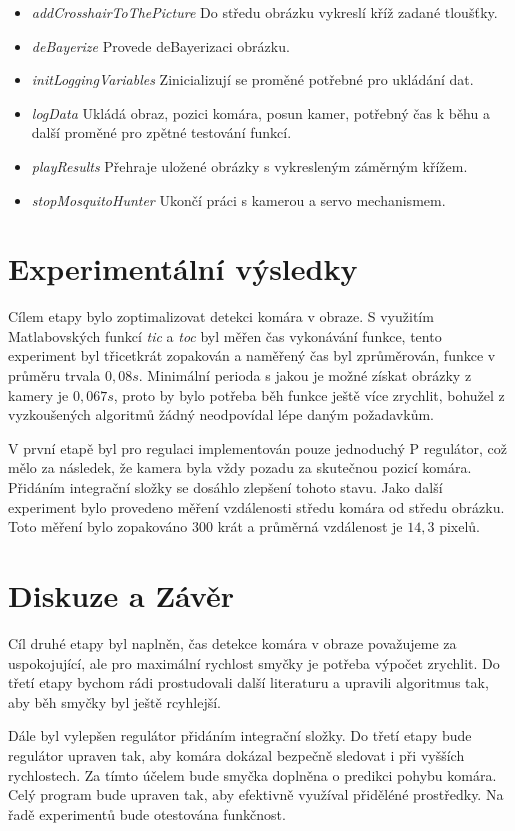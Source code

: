 \documentclass[a4paper,10pt]{article}
\begin{document}
		\begin{itemize}
				\item \textit{addCrosshairToThePicture} Do středu obrázku vykreslí kříž zadané tloušťky. 
				\item \textit{deBayerize} Provede deBayerizaci obrázku.
				\item \textit{initLoggingVariables} Zinicializují se proměné potřebné pro ukládání dat.
				\item \textit{logData} Ukládá obraz, pozici komára, posun kamer, potřebný čas k běhu a další proměné pro zpětné testování funkcí.
				\item \textit{playResults} Přehraje uložené obrázky s vykresleným záměrným křížem.
				\item \textit{stopMosquitoHunter} Ukončí práci s kamerou a servo mechanismem.
		\end{itemize}

\section{Experimentální výsledky}
		Cílem etapy bylo zoptimalizovat detekci komára v obraze. 
		S využitím Matlabovských funkcí \textit{tic} a \textit{toc} byl měřen čas vykonávání funkce, 
		tento experiment byl třicetkrát zopakován a naměřený čas byl zprůměrován, funkce v průměru trvala $0,08 s$. 
		Minimální perioda s jakou je možné získat obrázky z kamery je $0,067 s$, proto by bylo potřeba běh funkce ještě více zrychlit, bohužel z vyzkoušených algoritmů žádný neodpovídal lépe daným požadavkům. 

		V první etapě byl pro regulaci implementován pouze jednoduchý P regulátor, což mělo za následek, 
		že kamera byla vždy pozadu za skutečnou pozicí komára. Přidáním integrační složky se dosáhlo zlepšení tohoto stavu. 
		Jako další experiment bylo provedeno měření vzdálenosti středu komára od středu obrázku. 
		Toto měření bylo zopakováno 300 krát a průměrná vzdálenost je $14,3 $ pixelů.



\section{Diskuze a Závěr}
		Cíl druhé etapy byl naplněn, čas detekce komára v obraze považujeme za uspokojující, ale pro maximální rychlost smyčky je potřeba výpočet zrychlit. Do třetí etapy bychom rádi prostudovali další literaturu a upravili algoritmus tak, aby běh smyčky byl ještě rcyhlejší. 

		Dále byl vylepšen regulátor přidáním integrační složky. Do třetí etapy bude regulátor upraven tak, 
		aby komára dokázal bezpečně sledovat i při vyšších rychlostech.
		Za tímto účelem bude smyčka doplněna o predikci pohybu komára. Celý program bude upraven tak, aby efektivně využíval přiděléné prostředky.
		Na řadě experimentů bude otestována funkčnost. 



\end{document}

